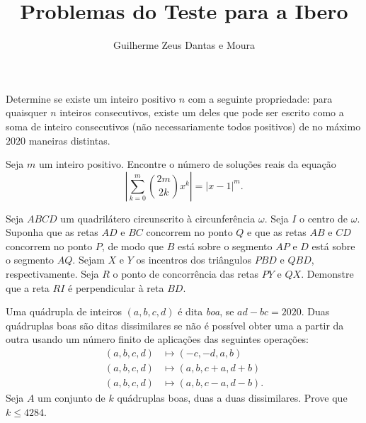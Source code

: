 \documentclass[10pt, a4paper]{article}
\title{Problemas do Teste para a Ibero}
\author{Guilherme Zeus Dantas e Moura}
\begin{document}
	
	\zeustitle

	\begin{prob}
		Determine se existe um inteiro positivo $n$ com a seguinte propriedade: para quaisquer $n$ inteiros consecutivos, existe um deles que pode ser escrito como a soma de inteiro consecutivos (não necessariamente todos positivos) de no máximo $2020$ maneiras distintas.
	\end{prob}

	\begin{prob}
		Seja $m$ um inteiro positivo. Encontre o número de soluções reais da equação \[\left| \sum_{k=0}^m \binom{2m}{2k} x^k \right| = \left| x - 1 \right|^m.\]
	\end{prob}

	\begin{prob}
		Seja $ABCD$ um quadrilátero circunscrito à circunferência $\omega$. Seja $I$ o centro de $\omega$. Suponha que as retas $AD$ e $BC$ concorrem no ponto $Q$ e que as retas $AB$ e $CD$ concorrem no ponto $P$, de modo que $B$ está sobre o segmento $AP$ e $D$ está sobre o segmento $AQ$. Sejam $X$ e $Y$ os incentros dos triângulos $PBD$ e $QBD$, respectivamente. Seja $R$ o ponto de concorrência das retas $PY$ e $QX$. Demonstre que a reta $RI$ é perpendicular à reta $BD$. 
	\end{prob}

	 \begin{prob}
		 Uma quádrupla de inteiros $(a, b, c, d)$ é dita \emph{boa}, se $ad - bc = 2020$. Duas quádruplas boas são ditas dissimilares se não é possível obter uma a partir da outra usando um número finito de aplicações das seguintes operações:
		  \begin{align*}
			  (a, b, c, d) & \mapsto (-c, -d, a, b)\\
			  (a, b, c, d) & \mapsto (a, b, c + a, d + b)\\
			  (a, b, c, d) & \mapsto (a, b, c - a, d - b).
		 \end{align*}
		Seja $A$ um conjunto de $k$ quádruplas boas, duas a duas dissimilares. Prove que $k \le 4284$.
	\end{prob}
\end{document}
